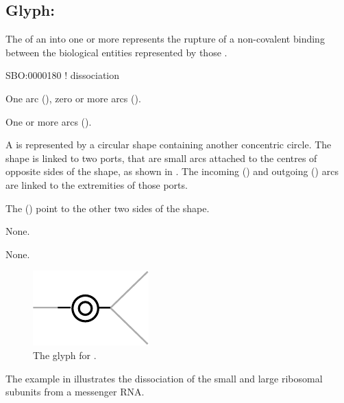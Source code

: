 \subsection{Glyph: }
\label{sec:dissociation}

The  of an  into one or more  represents the rupture of a non-covalent binding between the biological entities represented by those .

\begin{glyphDescription}

\glyphSboTerm
SBO:0000180 ! dissociation


\glyphIncoming
One  arc (), zero or more  arcs ().



\glyphOutgoing
One or more  arcs ().


\glyphContainer
A  is represented by a circular shape containing another concentric circle.
The shape is linked to two ports, that are small arcs attached to the centres of opposite sides of the shape, as shown in .
The incoming  () and outgoing  () arcs are linked to the extremities of those ports.

The  () point to the other two sides of the shape.

\glyphLabel
None.

\glyphAux
None.

\end{glyphDescription}

\begin{figure}[H]
  \centering
  \includegraphics{images/dissociation}
  \caption{The \PD glyph for .}
  \label{fig:dissociation}
\end{figure}

The example in  illustrates the dissociation of the small and large ribosomal subunits from a messenger RNA.

